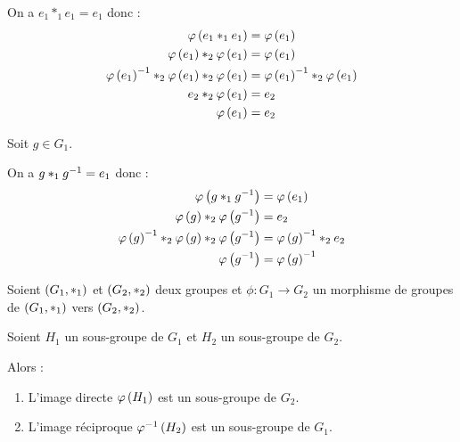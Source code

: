 \begin{dem}
On a \(e_1*_1e_1=e_1\) donc : \[\begin{aligned}
\varphi\left(e_1*_1e_1\right)&=\varphi\left(e_1\right) \\
\varphi\left(e_1\right)*_2\varphi\left(e_1\right)&=\varphi\left(e_1\right) \\
\varphi\left(e_1\right)^{-1}*_2\varphi\left(e_1\right)*_2\varphi\left(e_1\right)&=\varphi\left(e_1\right)^{-1}*_2\varphi\left(e_1\right) \\
e_2*_2\varphi\left(e_1\right)&=e_2 \\
\varphi\left(e_1\right)&=e_2
\end{aligned}\]

Soit \(g\in G_1\).

On a \(g*_1g^{-1}=e_1\) donc : \[\begin{aligned}
\varphi\left(g*_1g^{-1}\right)&=\varphi\left(e_1\right) \\
\varphi\left(g\right)*_2\varphi\left(g^{-1}\right)&=e_2 \\
\varphi\left(g\right)^{-1}*_2\varphi\left(g\right)*_2\varphi\left(g^{-1}\right)&=\varphi\left(g\right)^{-1}*_2e_2 \\
\varphi\left(g^{-1}\right)&=\varphi\left(g\right)^{-1}
\end{aligned}\]
\end{dem}

\begin{prop}
Soient \(\groupe{G_1}[*_1]\) et \(\groupe{G_2}[*_2]\) deux groupes et \(\phi:G_1\to G_2\) un morphisme de groupes de \(\groupe{G_1}[*_1]\) vers \(\groupe{G_2}[*_2]\).

Soient \(H_1\) un sous-groupe de \(G_1\) et \(H_2\) un sous-groupe de \(G_2\).

Alors :

\begin{enumerate}
\item L'image directe \(\varphi\left(H_1\right)\) est un sous-groupe de \(G_2\). \\

\item L'image réciproque \(\varphi^{-1}\left(H_2\right)\) est un sous-groupe de \(G_1\).
\end{enumerate}
\end{prop}

